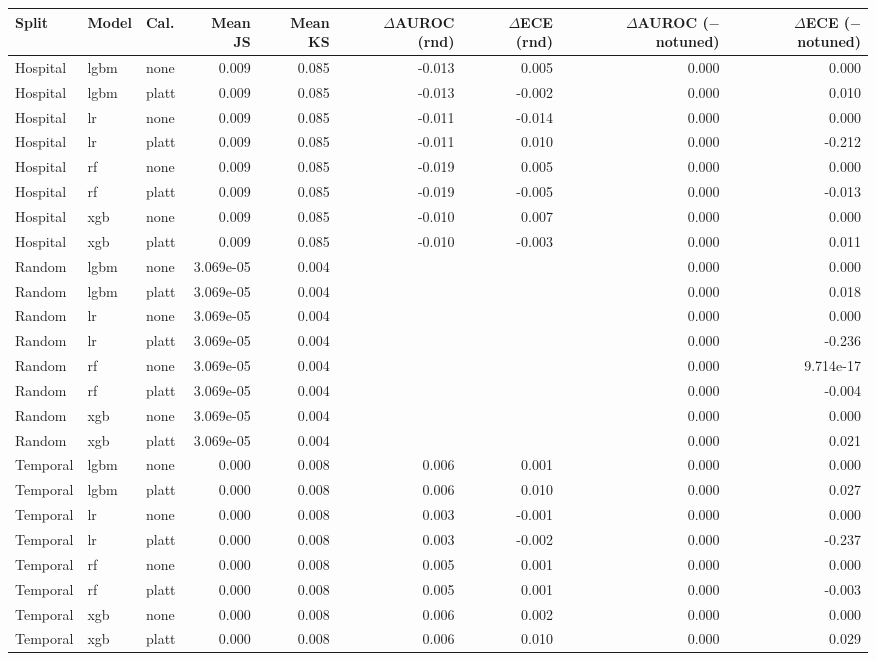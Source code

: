 \begin{tabular}{lllrrrrrr}
\toprule
Split & Model & Cal. & Mean JS & Mean KS & $\Delta$AUROC (rnd) & $\Delta$ECE (rnd) & $\Delta$AUROC ($-$notuned) & $\Delta$ECE ($-$notuned) \\
\midrule
Hospital & lgbm & none & 0.009 & 0.085 & -0.013 & 0.005 & 0.000 & 0.000 \\
Hospital & lgbm & platt & 0.009 & 0.085 & -0.013 & -0.002 & 0.000 & 0.010 \\
Hospital & lr & none & 0.009 & 0.085 & -0.011 & -0.014 & 0.000 & 0.000 \\
Hospital & lr & platt & 0.009 & 0.085 & -0.011 & 0.010 & 0.000 & -0.212 \\
Hospital & rf & none & 0.009 & 0.085 & -0.019 & 0.005 & 0.000 & 0.000 \\
Hospital & rf & platt & 0.009 & 0.085 & -0.019 & -0.005 & 0.000 & -0.013 \\
Hospital & xgb & none & 0.009 & 0.085 & -0.010 & 0.007 & 0.000 & 0.000 \\
Hospital & xgb & platt & 0.009 & 0.085 & -0.010 & -0.003 & 0.000 & 0.011 \\
Random & lgbm & none & 3.069e-05 & 0.004 &  &  & 0.000 & 0.000 \\
Random & lgbm & platt & 3.069e-05 & 0.004 &  &  & 0.000 & 0.018 \\
Random & lr & none & 3.069e-05 & 0.004 &  &  & 0.000 & 0.000 \\
Random & lr & platt & 3.069e-05 & 0.004 &  &  & 0.000 & -0.236 \\
Random & rf & none & 3.069e-05 & 0.004 &  &  & 0.000 & 9.714e-17 \\
Random & rf & platt & 3.069e-05 & 0.004 &  &  & 0.000 & -0.004 \\
Random & xgb & none & 3.069e-05 & 0.004 &  &  & 0.000 & 0.000 \\
Random & xgb & platt & 3.069e-05 & 0.004 &  &  & 0.000 & 0.021 \\
Temporal & lgbm & none & 0.000 & 0.008 & 0.006 & 0.001 & 0.000 & 0.000 \\
Temporal & lgbm & platt & 0.000 & 0.008 & 0.006 & 0.010 & 0.000 & 0.027 \\
Temporal & lr & none & 0.000 & 0.008 & 0.003 & -0.001 & 0.000 & 0.000 \\
Temporal & lr & platt & 0.000 & 0.008 & 0.003 & -0.002 & 0.000 & -0.237 \\
Temporal & rf & none & 0.000 & 0.008 & 0.005 & 0.001 & 0.000 & 0.000 \\
Temporal & rf & platt & 0.000 & 0.008 & 0.005 & 0.001 & 0.000 & -0.003 \\
Temporal & xgb & none & 0.000 & 0.008 & 0.006 & 0.002 & 0.000 & 0.000 \\
Temporal & xgb & platt & 0.000 & 0.008 & 0.006 & 0.010 & 0.000 & 0.029 \\
\bottomrule
\end{tabular}
